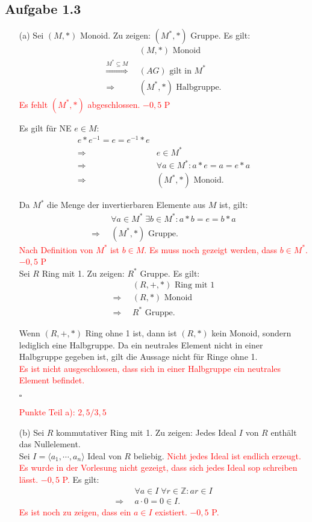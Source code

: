 \documentclass[12pt]{article}
\newcommand{\corr}[1]{\textcolor{red}{#1}}
\newcommand{\QED}{\begin{flushright} $\square$ \end{flushright}}
\newcommand{\df}{\Longrightarrow \enspace}
\begin{document}
\subsection*{Aufgabe 1.3}
\begin{enumerate}
\item[(a)]
Sei $(M,*)$ Monoid. Zu zeigen: $(M^*,*)$ Gruppe. Es gilt:
\begin{align*}
	&(M,*) \text{ Monoid} \\
	\overset{M^* \subseteq M}{\Longrightarrow} \enspace &(AG) \text{ gilt in } M^* \\
	\df &(M^*,*) \text{ Halbgruppe.}
\end{align*}
\corr{Es fehlt $(M^*,*)$ abgeschlossen. $-0,5$ P}

Es gilt für NE $e \in M$:
\begin{align*}
	e*e^{-1} = e = e^{-1}*e \\
	\df &e \in M^* \\
	\df &\forall a \in M^*: a*e = a = e*a \\
	\df &(M^*,*) \text{ Monoid.}
\end{align*}

Da $M^*$ die Menge der invertierbaren Elemente aus $M$ ist, gilt:
\begin{align*}
	&\forall a \in M^* \; \exists b \in M^*: a*b = e = b*a \\
	\df &(M^*,*) \text{ Gruppe.}
\end{align*}
\corr{Nach Definition von $M^*$ ist $b \in M$. Es muss noch gezeigt werden, dass $b \in M^*$. $-0,5$ P}\\
Sei $R$ Ring mit 1. Zu zeigen: $R^*$ Gruppe. Es gilt:
\begin{align*}
	&(R,+,*) \text{ Ring mit 1} \\
	\df &(R,*) \text{ Monoid} \\
	\df &R^* \text{ Gruppe.}
\end{align*}

Wenn $(R,+,*)$ Ring ohne 1 ist, dann ist $(R,*)$ kein Monoid, sondern lediglich eine Halbgruppe.
Da ein neutrales Element nicht in einer Halbgruppe gegeben ist, gilt die Aussage nicht für Ringe ohne 1.\\
\corr{Es ist nicht ausgeschlossen, dass sich in einer Halbgruppe ein neutrales Element befindet.}
\QED
\corr{Punkte Teil a): $2,5/3,5$}


\item[(b)]
Sei $R$ kommutativer Ring mit 1. Zu zeigen: Jedes Ideal $I$ von $R$ enthält das Nullelement. \\
Sei $I = \langle a_1, \cdots, a_n \rangle$ Ideal von $R$ beliebig. \corr{Nicht jedes Ideal ist endlich erzeugt. Es wurde in der Vorlesung nicht gezeigt, dass sich jedes Ideal sop schreiben lässt. $-0,5$ P.} Es gilt:
\begin{align*}
	&\forall a \in I \; \forall r \in \mathbb{Z}: a r \in I \\
	\df &a \cdot 0 = 0 \in I.
\end{align*}
\corr{Es ist noch zu zeigen, dass ein $a\in I$ existiert. $-0,5$ P.}


\end{enumerate}
\end{document}
